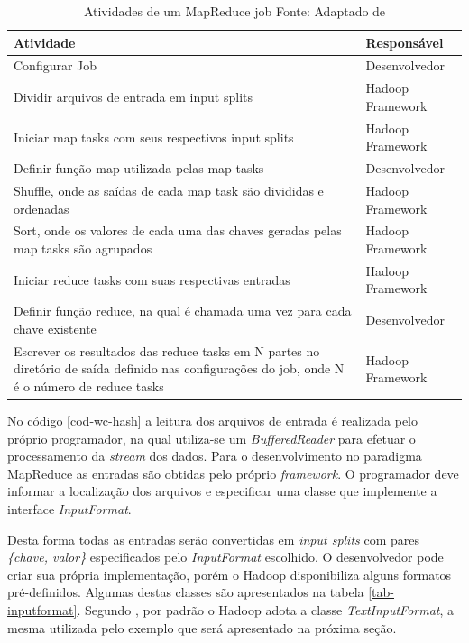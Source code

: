 \begin{table}[!ht]
\begin{center}
  \begin{tabular}{|p{5cm}|p{5cm}|}
	\hline
	Atividade & Responsável	
	\\ \hline
	Configurar Job & Desenvolvedor
	\\ \hline
	Dividir arquivos de entrada em input splits & Hadoop Framework
	\\ \hline
	Iniciar map tasks com seus respectivos input splits & Hadoop Framework
	\\ \hline
	Definir função map utilizada pelas map tasks & Desenvolvedor
	\\ \hline
	Shuffle, onde as saídas de cada map task são divididas e ordenadas & Hadoop Framework
	\\ \hline
	Sort, onde os valores de cada uma das chaves geradas pelas map tasks são agrupados & Hadoop Framework
	\\ \hline
	Iniciar reduce tasks com suas respectivas entradas & Hadoop Framework
	\\ \hline
	Definir função reduce, na qual é chamada uma vez para cada chave existente & Desenvolvedor
	\\ \hline
	Escrever os resultados das reduce tasks em N partes no diretório de saída definido nas configurações do job, onde N é o número de reduce tasks & Hadoop Framework
	\\ \hline
  \end{tabular}
  \captionsetup{justification=centering}
  \caption[Atividades de um MapReduce job]{Atividades de um MapReduce job
  \protect\linebreak Fonte: Adaptado de \cite{venner2009}}
\label{tab-mapreduce-job}
\end{center}
\end{table}
\FloatBarrier

No código \ref{cod-wc-hash} a leitura dos arquivos de entrada é realizada pelo próprio programador, na qual utiliza-se um \textit{BufferedReader} para efetuar o processamento da \textit{stream} dos dados. Para o desenvolvimento no paradigma MapReduce as entradas são obtidas pelo próprio \textit{framework}. O programador deve informar a localização dos arquivos e especificar uma classe que implemente a interface \textit{InputFormat}. 

Desta forma todas as entradas serão convertidas em \textit{input splits} com pares \textit{\{chave, valor\}} especificados pelo \textit{InputFormat} escolhido. O desenvolvedor pode criar sua própria implementação, porém o Hadoop disponibiliza alguns formatos pré-definidos. Algumas destas classes são apresentados na tabela \ref{tab-inputformat}. Segundo , por padrão o Hadoop adota a classe \textit{TextInputFormat}, a mesma utilizada pelo exemplo que será apresentado na próxima seção.

